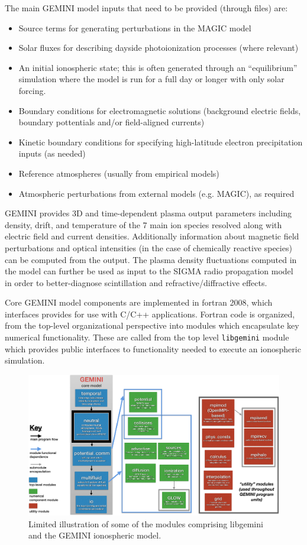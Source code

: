\documentclass[11pt,letterpaper]{article}
\begin{document}
The main GEMINI model inputs that need to be provided (through files) are:
\begin{itemize}
  \item Source terms for generating perturbations in the MAGIC model 
  \item Solar fluxes for describing dayside photoionization processes (where relevant)
  \item An initial ionospheric state; this is often generated through an ``equilibrium'' simulation where the model is run for a full day or longer with only solar forcing.  
  \item Boundary conditions for electromagnetic solutions (background electric fields, boundary pottentials and/or field-aligned currents)
  \item Kinetic boundary conditions for specifying high-latitude electron precipitation inputs (as needed)
  \item Reference atmospheres (usually from empirical models)
  \item Atmospheric perturbations from external models (e.g. MAGIC), as required
\end{itemize}
GEMINI provides 3D and time-dependent plasma output parameters including density, drift, and temperature of the 7 main ion species resolved along with electric field and current densities.  Additionally information about magnetic field perturbations and optical intensities (in the case of chemically reactive species) can be computed from the output.  The plasma density fluctuations computed in the model can further be used as input to the SIGMA radio propagation model in order to better-diagnose scintillation and refractive/diffractive effects.  

Core GEMINI model components are implemented in fortran 2008, which interfaces provides for use with C/C++ applications.  Fortran code is organized, from the top-level organizational perspective into modules which encapsulate key numerical functionality.  These are called from the top level \texttt{libgemini} module which provides public interfaces to functionality needed to execute an ionospheric simulation.  
\begin{figure}
  \includegraphics[width=\textwidth]{./figures/modules-crop.pdf}
  \caption{Limited illustration of some of the modules comprising libgemini and the GEMINI ionospheric model.}
  \label{fig:module}
\end{figure}
\end{document}
